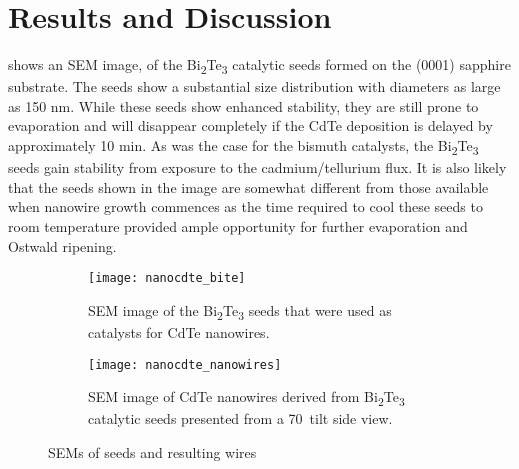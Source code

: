 \section{Results and Discussion}
 shows an SEM image, of the Bi\textsubscript{2}Te\textsubscript{3}
catalytic seeds formed on the (0001) sapphire substrate. The
seeds show a substantial size distribution with diameters
as large as 150 nm. While these seeds show enhanced
stability, they are still prone to evaporation and will disappear
completely if the CdTe deposition is delayed by approximately
10 min. As was the case for the bismuth catalysts, the Bi\textsubscript{2}Te\textsubscript{3}
seeds gain stability from exposure to the cadmium/tellurium
flux. It is also likely that the seeds shown in the image
are somewhat different from those available when nanowire
growth commences as the time required to cool these seeds
to room temperature provided ample opportunity for further
evaporation and Ostwald ripening.
\begin{figure}
    \centering
    \begin{subfigure}[t]{0.5\textwidth}
        \centering
        \texttt{[image: nanocdte\_bite]}
        \caption{\label{fig:nanocdte_bite}SEM image of the Bi\textsubscript{2}Te\textsubscript{3} seeds that were used as catalysts 
            for CdTe nanowires.}
    \end{subfigure}%
    \begin{subfigure}[t]{0.5\textwidth}
        \centering
        \texttt{[image: nanocdte\_nanowires]}
        \caption{\label{fig:nanocdte_nanowires} SEM image of CdTe nanowires derived from Bi\textsubscript{2}Te\textsubscript{3}
            catalytic seeds presented from a 70\degree~tilt side view.}
    \end{subfigure}
    \caption{\label{fig:nanocdte_sem}SEMs of seeds and resulting wires}
\end{figure}

